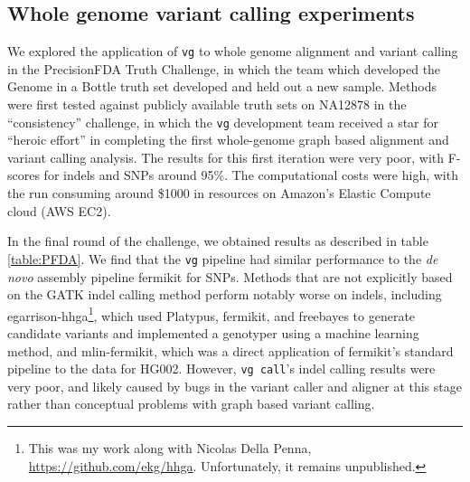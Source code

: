 \subsection{Whole genome variant calling experiments}

We explored the application of {\tt vg} to whole genome alignment and variant calling in the PrecisionFDA Truth Challenge, in which the team which developed the Genome in a Bottle truth set developed and held out a new sample.
Methods were first tested against publicly available truth sets on NA12878 in the ``consistency'' challenge, in which the {\tt vg} development team received a star for ``heroic effort'' in completing the first whole-genome graph based alignment and variant calling analysis.
The results for this first iteration were very poor, with F-scores for indels and SNPs around 95\%.
The computational costs were high, with the run consuming around \$1000 in resources on Amazon's Elastic Compute cloud (AWS EC2).

In the final round of the challenge, we obtained results as described in table \ref{table:PFDA}.
We find that the {\tt vg} pipeline had similar performance to the \emph{de novo} assembly pipeline fermikit for SNPs.
Methods that are not explicitly based on the GATK indel calling method perform notably worse on indels, including egarrison-hhga\footnote{This was my work along with Nicolas Della Penna, \url{https://github.com/ekg/hhga}. Unfortunately, it remains unpublished.}, which used Platypus, fermikit, and freebayes to generate candidate variants and implemented a genotyper using a machine learning method, and mlin-fermikit, which was a direct application of fermikit's standard pipeline to the data for HG002.
However, {\tt vg call}'s indel calling results were very poor, and likely caused by bugs in the variant caller and aligner at this stage rather than conceptual problems with graph based variant calling.

